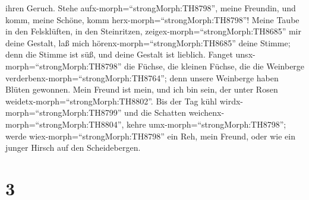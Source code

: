 ihren Geruch. Stehe aufx-morph=``strongMorph:TH8798'', meine Freundin,
und komm, meine Schöne, komm herx-morph=``strongMorph:TH8798''!
 Meine Taube in den Felsklüften, in den Steinritzen,
zeigex-morph=``strongMorph:TH8685'' mir deine Gestalt, laß mich
hörenx-morph=``strongMorph:TH8685'' deine Stimme; denn die Stimme ist
süß, und deine Gestalt ist lieblich.  Fanget
unsx-morph=``strongMorph:TH8798'' die Füchse, die kleinen Füchse, die
die Weinberge verderbenx-morph=``strongMorph:TH8764''; denn unsere
Weinberge haben Blüten gewonnen.  Mein Freund ist mein, und
ich bin sein, der unter Rosen weidetx-morph=``strongMorph:TH8802''.
 Bis der Tag kühl wirdx-morph=``strongMorph:TH8799'' und
die Schatten weichenx-morph=``strongMorph:TH8804'', kehre
umx-morph=``strongMorph:TH8798''; werde
wiex-morph=``strongMorph:TH8798'' ein Reh, mein Freund, oder wie ein
junger Hirsch auf den Scheidebergen.

\hypertarget{section-2}{%
\section{3}\label{section-2}}

